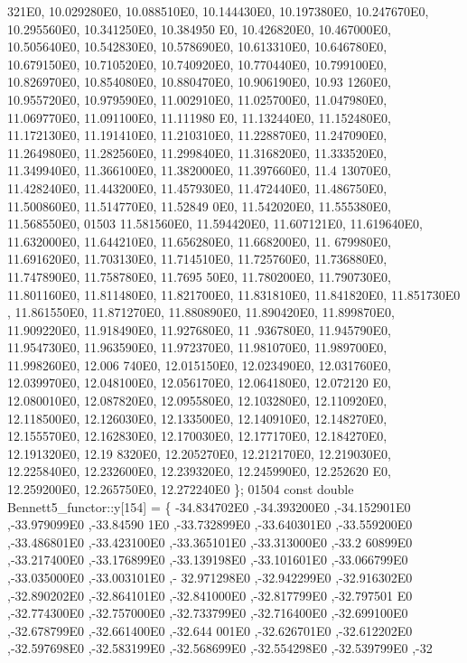 \begin{DoxyCode}
      321E0, 10.029280E0, 10.088510E0, 10.144430E0, 10.197380E0, 10.247670E0, 10.295560E0, 10.341250E0, 10.384950
      E0, 10.426820E0, 10.467000E0, 10.505640E0, 10.542830E0, 10.578690E0, 10.613310E0, 10.646780E0, 10.679150E0, 
      10.710520E0, 10.740920E0, 10.770440E0, 10.799100E0, 10.826970E0, 10.854080E0, 10.880470E0, 10.906190E0, 10.93
      1260E0, 10.955720E0, 10.979590E0, 11.002910E0, 11.025700E0, 11.047980E0, 11.069770E0, 11.091100E0, 11.111980
      E0, 11.132440E0, 11.152480E0, 11.172130E0, 11.191410E0, 11.210310E0, 11.228870E0, 11.247090E0, 11.264980E0, 
      11.282560E0, 11.299840E0, 11.316820E0, 11.333520E0, 11.349940E0, 11.366100E0, 11.382000E0, 11.397660E0, 11.4
      13070E0, 11.428240E0, 11.443200E0, 11.457930E0, 11.472440E0, 11.486750E0, 11.500860E0, 11.514770E0, 11.52849
      0E0, 11.542020E0, 11.555380E0, 11.568550E0,
01503 11.581560E0, 11.594420E0, 11.607121E0, 11.619640E0, 11.632000E0, 11.644210E0, 11.656280E0, 11.668200E0, 11.
      679980E0, 11.691620E0, 11.703130E0, 11.714510E0, 11.725760E0, 11.736880E0, 11.747890E0, 11.758780E0, 11.7695
      50E0, 11.780200E0, 11.790730E0, 11.801160E0, 11.811480E0, 11.821700E0, 11.831810E0, 11.841820E0, 11.851730E0
      , 11.861550E0, 11.871270E0, 11.880890E0, 11.890420E0, 11.899870E0, 11.909220E0, 11.918490E0, 11.927680E0, 11
      .936780E0, 11.945790E0, 11.954730E0, 11.963590E0, 11.972370E0, 11.981070E0, 11.989700E0, 11.998260E0, 12.006
      740E0, 12.015150E0, 12.023490E0, 12.031760E0, 12.039970E0, 12.048100E0, 12.056170E0, 12.064180E0, 12.072120
      E0, 12.080010E0, 12.087820E0, 12.095580E0, 12.103280E0, 12.110920E0, 12.118500E0, 12.126030E0, 12.133500E0, 
      12.140910E0, 12.148270E0, 12.155570E0, 12.162830E0, 12.170030E0, 12.177170E0, 12.184270E0, 12.191320E0, 12.19
      8320E0, 12.205270E0, 12.212170E0, 12.219030E0, 12.225840E0, 12.232600E0, 12.239320E0, 12.245990E0, 12.252620
      E0, 12.259200E0, 12.265750E0, 12.272240E0 \};
01504 \textcolor{keyword}{const} \textcolor{keywordtype}{double} Bennett5\_functor::y[154] = \{ -34.834702E0 ,-34.393200E0 ,-34.152901E0 ,-33.979099E0 ,-33.84590
      1E0 ,-33.732899E0 ,-33.640301E0 ,-33.559200E0 ,-33.486801E0 ,-33.423100E0 ,-33.365101E0 ,-33.313000E0 ,-33.2
      60899E0 ,-33.217400E0 ,-33.176899E0 ,-33.139198E0 ,-33.101601E0 ,-33.066799E0 ,-33.035000E0 ,-33.003101E0 ,-
      32.971298E0 ,-32.942299E0 ,-32.916302E0 ,-32.890202E0 ,-32.864101E0 ,-32.841000E0 ,-32.817799E0 ,-32.797501
      E0 ,-32.774300E0 ,-32.757000E0 ,-32.733799E0 ,-32.716400E0 ,-32.699100E0 ,-32.678799E0 ,-32.661400E0 ,-32.644
      001E0 ,-32.626701E0 ,-32.612202E0 ,-32.597698E0 ,-32.583199E0 ,-32.568699E0 ,-32.554298E0 ,-32.539799E0 ,-32

\end{DoxyCode}
